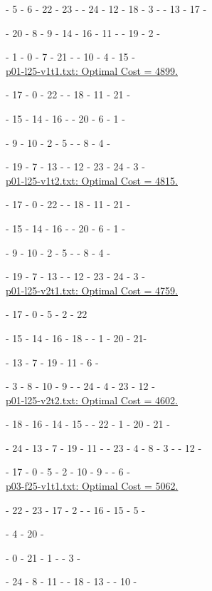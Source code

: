 \ta - 5 - 6 - 22 - 23 - \ta - 24 - 12 - 18 - 3 - \ta - 13 - 17 - \ta

\te - 20 - 8 - 9 - 14 - 16 - 11 - \te - 19 - 2  - \te

\te - 1 - 0 - 7 - 21 - \te - 10 - 4 - 15 - \te
\\ 

\underline{p01-l25-v1t1.txt: Optimal Cost =  4899.}
 
\ta - 17 - 0 - 22 - \ta - 18 - 11 - 21 - \ta

\ta - 15 - 14 - 16 - \ta - 20 - 6 - 1 - \ta

\tb - 9 - 10 - 2 - 5 - \tb - 8 - 4 - \tb

\tb - 19 - 7 - 13 - \tb - 12 - 23 - 24 - 3 - \tb
\\ 

\underline{p01-l25-v1t2.txt: Optimal Cost =  4815.}
 
\ta - 17 - 0 - 22 - \ta - 18 - 11 - 21 - \ta
  
\ta - 15 - 14 - 16 - \ta - 20 - 6 - 1 - \ta

\te - 9 - 10 - 2 - 5 - \te - 8 - 4 - \te

\te - 19 - 7 - 13 - \te - 12 - 23 - 24 - 3 - \te
\\ 

\underline{p01-l25-v2t1.txt: Optimal Cost =  4759.}
 
\ta - 17 - 0 - 5 - 2 - 22 \ta

\ta - 15 - 14 - 16 - 18 - \ta - 1 - 20 - 21- \ta

\te -  13 - 7 - 19 - 11 - 6 -\te

\te -  3 - 8 - 10 - 9 - \te - 24 - 4 - 23 - 12 - \te
\\ 

\underline{p01-l25-v2t2.txt: Optimal Cost =  4602.} 
  
\ta - 18 - 16 - 14 - 15 - \ta - 22 - 1 - 20 - 21 - \ta

\tb - 24 - 13 - 7 - 19 - 11 - \tb - 23 - 4 - 8 - 3 - \tb - 12 - \tb

\tb - 17 - 0 - 5 - 2 - 10 - 9 - \tb - 6 - \tb
\\ 

\underline{p03-f25-v1t1.txt: Optimal Cost =  5062.}
 
\ta - 22 - 23 - 17 - 2 - \ta - 16 - 15 - 5 - \ta

\ta - 4 - 20 - \ta

\ta - 0 - 21 - 1 - \ta - 3 - \ta

\tc - 24 - 8 - 11 - \tc - 18 - 13 - \tc - 10 - \tc 
 
